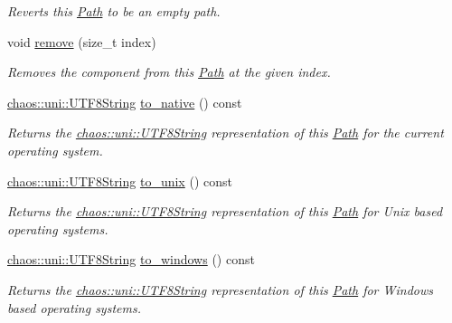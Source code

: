 \begin{DoxyCompactItemize}
\begin{DoxyCompactList}\small\item\em Reverts this \hyperlink{classchaos_1_1io_1_1sys_1_1_path}{Path} to be an empty path. \end{DoxyCompactList}\item 
void \hyperlink{classchaos_1_1io_1_1sys_1_1_path_aefc69b11820209acca278104fb230832}{remove} (size\+\_\+t index)
\begin{DoxyCompactList}\small\item\em Removes the component from this \hyperlink{classchaos_1_1io_1_1sys_1_1_path}{Path} at the given index. \end{DoxyCompactList}\item 
\hyperlink{classchaos_1_1uni_1_1_u_t_f8_string}{chaos\+::uni\+::\+U\+T\+F8\+String} \hyperlink{classchaos_1_1io_1_1sys_1_1_path_adb68b7589d18dc78f19d9dd6936d9833}{to\+\_\+native} () const 
\begin{DoxyCompactList}\small\item\em Returns the \hyperlink{classchaos_1_1uni_1_1_u_t_f8_string}{chaos\+::uni\+::\+U\+T\+F8\+String} representation of this \hyperlink{classchaos_1_1io_1_1sys_1_1_path}{Path} for the current operating system. \end{DoxyCompactList}\item 
\hyperlink{classchaos_1_1uni_1_1_u_t_f8_string}{chaos\+::uni\+::\+U\+T\+F8\+String} \hyperlink{classchaos_1_1io_1_1sys_1_1_path_a1cfe95a7a81ba7da856ae79917e6b1bf}{to\+\_\+unix} () const 
\begin{DoxyCompactList}\small\item\em Returns the \hyperlink{classchaos_1_1uni_1_1_u_t_f8_string}{chaos\+::uni\+::\+U\+T\+F8\+String} representation of this \hyperlink{classchaos_1_1io_1_1sys_1_1_path}{Path} for Unix based operating systems. \end{DoxyCompactList}\item 
\hyperlink{classchaos_1_1uni_1_1_u_t_f8_string}{chaos\+::uni\+::\+U\+T\+F8\+String} \hyperlink{classchaos_1_1io_1_1sys_1_1_path_ad7b185968a88741d52526a32738d0ab4}{to\+\_\+windows} () const 
\begin{DoxyCompactList}\small\item\em Returns the \hyperlink{classchaos_1_1uni_1_1_u_t_f8_string}{chaos\+::uni\+::\+U\+T\+F8\+String} representation of this \hyperlink{classchaos_1_1io_1_1sys_1_1_path}{Path} for Windows based operating systems. \end{DoxyCompactList}\item 

\end{DoxyCompactItemize}
